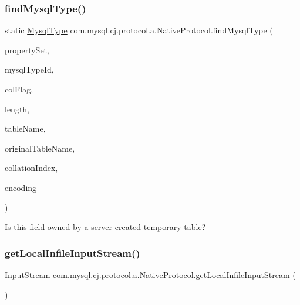 \subsubsection{\texorpdfstring{find\+Mysql\+Type()}{findMysqlType()}}
{\footnotesize\ttfamily static \mbox{\hyperlink{enumcom_1_1mysql_1_1cj_1_1_mysql_type}{Mysql\+Type}} com.\+mysql.\+cj.\+protocol.\+a.\+Native\+Protocol.\+find\+Mysql\+Type (\begin{DoxyParamCaption}\item[{\mbox{\hyperlink{interfacecom_1_1mysql_1_1cj_1_1conf_1_1_property_set}{Property\+Set}}}]{property\+Set,  }\item[{int}]{mysql\+Type\+Id,  }\item[{short}]{col\+Flag,  }\item[{long}]{length,  }\item[{\mbox{\hyperlink{classcom_1_1mysql_1_1cj_1_1util_1_1_lazy_string}{Lazy\+String}}}]{table\+Name,  }\item[{\mbox{\hyperlink{classcom_1_1mysql_1_1cj_1_1util_1_1_lazy_string}{Lazy\+String}}}]{original\+Table\+Name,  }\item[{int}]{collation\+Index,  }\item[{String}]{encoding }\end{DoxyParamCaption})\hspace{0.3cm}{\ttfamily [static]}}

Is this field owned by a server-\/created temporary table?\mbox{\label{classcom_1_1mysql_1_1cj_1_1protocol_1_1a_1_1_native_protocol_a27e42d277d58cc8bc89f098b9ac90691}} 
\subsubsection{\texorpdfstring{get\+Local\+Infile\+Input\+Stream()}{getLocalInfileInputStream()}}
{\footnotesize\ttfamily Input\+Stream com.\+mysql.\+cj.\+protocol.\+a.\+Native\+Protocol.\+get\+Local\+Infile\+Input\+Stream (\begin{DoxyParamCaption}{ }\end{DoxyParamCaption})}

